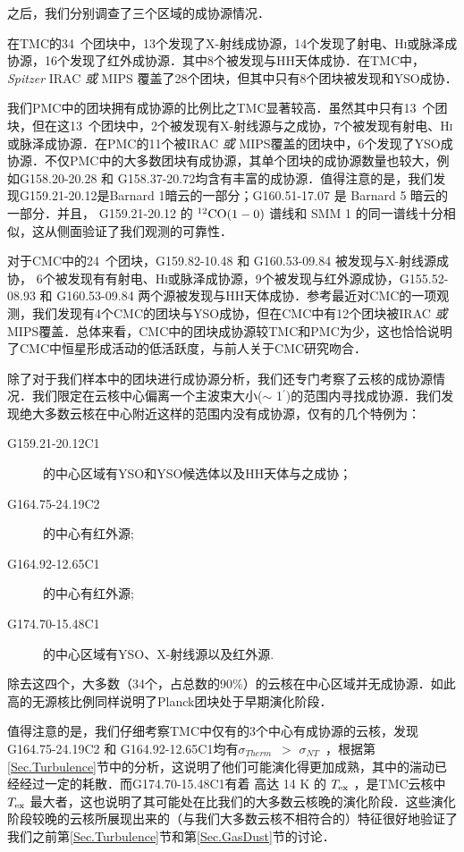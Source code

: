 \documentclass[UTF8, nocolorlinks]{pkuthss}
\newcommand{\coaa}{$\rm^{12}CO(1-0)$ }
\newcommand{\texc}{$T_{\rm {ex}}$ }
\newcommand{\sigmath}{$\sigma _{Therm}$\ }
\newcommand{\sigmant}{$\sigma _{NT}$\ }
\newcommand{\arcmin}{$^{\prime}$}
\newcommand{\numsoutmc}{34\ }
\newcommand{\numsoupmc}{13\ }
\newcommand{\numsoucmc}{24\ }
\begin{document}
		之后，我们分别调查了三个区域的成协源情况．

		在TMC的\numsoutmc 个团块中，13个发现了X-射线成协源，14个发现了射电、H\textsc{i}或脉泽成协源，16个发现了红外成协源．其中8个被发现与HH天体成协．在TMC中，\emph{Spitzer} IRAC \emph{或} MIPS 覆盖了28个团块，但其中只有8个团块被发现和YSO成协．

		我们PMC中的团块拥有成协源的比例比之TMC显著较高．虽然其中只有\numsoupmc 个团块，但在这\numsoupmc 个团块中，2个被发现有X-射线源与之成协，7个被发现有射电、H\textsc{i}或脉泽成协源．在PMC的11个被IRAC \emph{或} MIPS覆盖的团块中，6个发现了YSO成协源．不仅PMC中的大多数团块有成协源，其单个团块的成协源数量也较大，例如G158.20-20.28 和 G158.37-20.72均含有丰富的成协源．值得注意的是，我们发现G159.21-20.12是Barnard 1暗云的一部分\supercite{1986ApJ...303L..11G}；G160.51-17.07 是 Barnard 5 暗云的一部分\supercite{2010ApJ...712..778H}．并且， G159.21-20.12 的 \coaa 谱线和 SMM 1 的同一谱线十分相似\supercite{2010ApJ...712..778H}，这从侧面验证了我们观测的可靠性．

		对于CMC中的\numsoucmc 个团块，G159.82-10.48 和 G160.53-09.84 被发现与X-射线源成协， 6个被发现有有射电、H\textsc{i}或脉泽成协源，9个被发现与红外源成协，G155.52-08.93 和 G160.53-09.84 两个源被发现与HH天体成协．参考最近对CMC的一项观测\supercite{2013ApJ...764..133H}，我们发现有4个CMC的团块与YSO成协，但在CMC中有12个团块被IRAC \emph{或} MIPS覆盖．总体来看，CMC中的团块成协源较TMC和PMC为少，这也恰恰说明了CMC中恒星形成活动的低活跃度，与前人关于CMC研究吻合．

		除了对于我们样本中的团块进行成协源分析，我们还专门考察了云核的成协源情况．我们限定在云核中心偏离一个主波束大小($\sim$ 1\arcmin )的范围内寻找成协源．我们发现绝大多数云核在中心附近这样的范围内没有成协源，仅有的几个特例为：

		\begin{description}
		\item[G159.21-20.12C1]的中心区域有YSO和YSO候选体以及HH天体与之成协；
		\item[G164.75-24.19C2]的中心有红外源;
		\item[G164.92-12.65C1]的中心有红外源;
		\item[G174.70-15.48C1]的中心区域有YSO、X-射线源以及红外源.
		\end{description}

		除去这四个，大多数（34个，占总数的90\%）的云核在中心区域并无成协源．如此高的无源核比例同样说明了Planck团块处于早期演化阶段．

		值得注意的是，我们仔细考察TMC中仅有的3个中心有成协源的云核，发现 G164.75-24.19C2 和 G164.92-12.65C1均有\sigmath $>$ \sigmant ，根据第\ref{Sec.Turbulence}节中的分析，这说明了他们可能演化得更加成熟，其中的湍动已经经过一定的耗散．而G174.70-15.48C1有着 高达 14 K 的 \texc ，是TMC云核中\texc 最大者，这也说明了其可能处在比我们的大多数云核晚的演化阶段．这些演化阶段较晚的云核所展现出来的（与我们大多数云核不相符合的）特征很好地验证了我们之前第\ref{Sec.Turbulence}节和第\ref{Sec.GasDust}节的讨论．
\end{document}

